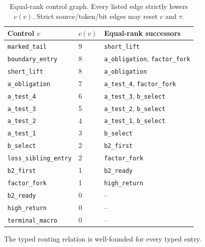 \begin{table}[ht]
\centering
\small
\begin{tabular}{@{}lll@{}}
\toprule
Control $v$ & $c(v)$ & Equal-rank successors \\
\midrule
\texttt{marked\_tail} & 9 & \texttt{short\_lift} \\
\texttt{boundary\_entry} & 8 & \texttt{a\_obligation}, \texttt{factor\_fork} \\
\texttt{short\_lift} & 8 & \texttt{a\_obligation} \\
\texttt{a\_obligation} & 7 & \texttt{a\_test\_4}, \texttt{factor\_fork} \\
\texttt{a\_test\_4} & 6 & \texttt{a\_test\_3}, \texttt{b\_select} \\
\texttt{a\_test\_3} & 5 & \texttt{a\_test\_2}, \texttt{b\_select} \\
\texttt{a\_test\_2} & 4 & \texttt{a\_test\_1}, \texttt{b\_select} \\
\texttt{a\_test\_1} & 3 & \texttt{b\_select} \\
\texttt{b\_select} & 2 & \texttt{b2\_first} \\
\texttt{loss\_sibling\_entry} & 2 & \texttt{factor\_fork} \\
\texttt{b2\_first} & 1 & \texttt{b2\_ready} \\
\texttt{factor\_fork} & 1 & \texttt{high\_return} \\
\texttt{b2\_ready} & 0 & -- \\
\texttt{high\_return} & 0 & -- \\
\texttt{terminal\_macro} & 0 & -- \\
\bottomrule
\end{tabular}
\caption{Equal-rank control graph. Every listed edge strictly lowers $c(v)$.
Strict source/token/bit edges may reset $c$ and $\tau$.}
\label{tab:control}
\end{table}

\begin{proposition}\label{prop:typed-normalizer}
The typed routing relation is well-founded for every typed entry.
\end{proposition}

